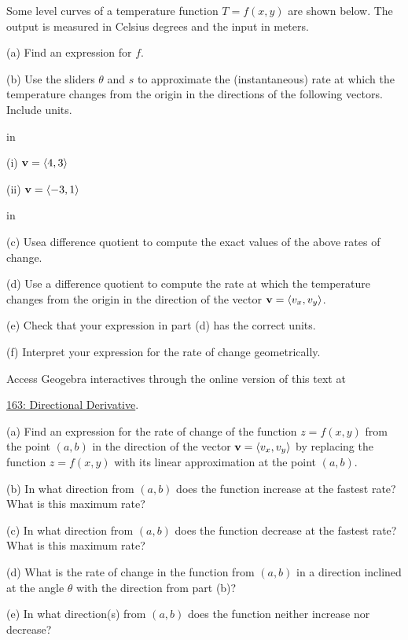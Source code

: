 \documentclass{ximera}
\newcommand{\pskip}{\vskip 0.1 in}
\begin{document}
\begin{question}  \label{Ee53hhy}

Some level curves of a temperature function $T = f(x,y)$ are shown below. The output is measured in Celsius degrees and the input in meters.

(a) Find an expression for $f$.

(b) Use the sliders $\theta$ and $s$ to approximate the (instantaneous) rate at which the temperature changes from the origin in the directions of the following vectors. Include units.

\pskip

(i) ${\bf v} = \langle 4 , 3 \rangle $

(ii) ${\bf v} = \langle -3,1\rangle $

\pskip

(c) Usea  difference quotient to compute the exact values of the above rates of change.

(d) Use a difference quotient to compute the rate  at which the temperature changes from the origin in the direction of the vector ${\bf v}=\langle v_x , v_y \rangle$. 

(e) Check that your expression in part (d) has the correct units.

(f) Interpret your expression for the rate of change geometrically.


 
\begin{onlineOnly}
    \begin{center}
\end{center}
\end{onlineOnly}

Access Geogebra interactives through the online version of this text at
 
\href{https://www.geogebra.org/classic/htee9xke}{163: Directional Derivative}.
\end{question}


\begin{question}  \label{Qedf4t5t}
(a) Find an expression for the rate of change of the function $z=f(x,y)$ from the point $(a,b)$ in the direction of the vector ${\bf v} = \langle v_x, v_y \rangle$ by replacing the function $z=f(x,y)$ with its linear approximation at the point $(a,b)$.

(b) In what direction from $(a,b)$ does the function increase at the fastest rate? What is this maximum rate?

(c) In what direction from $(a,b)$ does the function decrease at the fastest rate? What is this maximum rate?

(d) What is the rate of change in the function from $(a,b)$ in a direction inclined at the angle $\theta$ with the direction from part (b)?

(e)  In what direction(s) from $(a,b)$ does the function neither increase nor decrease?

\end{question}
\end{document}
